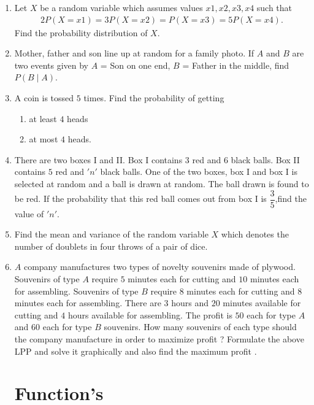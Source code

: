 \documentclass[12pt,-letter paper]{article}
\providecommand{\brak}[1]{\ensuremath{\left(#1\right)}}
\begin{document}
\begin{enumerate}
\item Let $X$ be a random variable which assumes values $x1, x2, x3, x4$ such that 
\begin{align*}
2P\brak{X = x1} = 3P\brak{X = x2} = P\brak{X = x3} = 5P\brak{X = x4}.
\end{align*}
Find the probability distribution of $X$.

\item Mother, father and son line up at random for a family photo. If $A$ and $B$ are two events given by $A$ = Son on one end, $B$ = Father in the middle, find $P(B\mid A)$.

\item A coin is tossed $5$ times. Find the probability of getting \begin{enumerate}[label=\roman*.]
    \item  at least $4$ heads
    \item at most $4$ heads.
    \end{enumerate}
    
    \item There are two boxes I and II. Box I contains $3$ red and $6$ black balls. Box II contains $5$ red and $'n'$ black balls. One of the two boxes, box I and box I is selected at random and a ball is drawn at random. The ball drawn is found to be red. If the probability that this red ball comes out from box I is $\dfrac{3}{5}$,find the value of $'n'$.

\item Find the mean and variance of the random variable $X$ which denotes the number of doublets in four throws of a pair of dice.

\item $A$ company manufactures two types of novelty souvenirs made of plywood. Souvenirs of type $A$ require $5$ minutes each for cutting and $10$ minutes each for assembling. Souvenirs of type $B$ require $8$ minutes each for cutting and $8$ minutes each for assembling. There are $3$ hours and $20$ minutes available for cutting and $4$ hours available for  assembling. The profit is \rupee $50$ each for type $A$ and \rupee $60$  each for type $B$ souvenirs. How many souvenirs of each type should the company manufacture in order to maximize profit ? Formulate the above LPP and solve it graphically and also find the maximum profit .

\section{Function's}
    

\end{enumerate}
\end{document}
